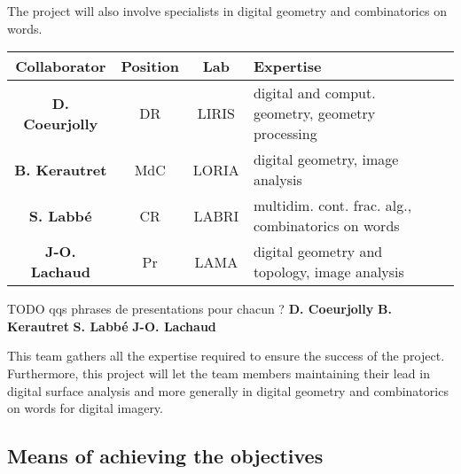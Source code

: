 The project will also involve specialists in digital geometry and combinatorics on words. 
\begin{table}[h]
\small
\centering
\begin{tabular}{|ccclcc|}
\hline
Collaborator & Position & Lab & Expertise \\ \hline
\hline
\textbf{D. Coeurjolly} & DR & LIRIS & digital and comput. geometry, geometry processing \\ \hline
\textbf{B. Kerautret} & MdC & LORIA & digital geometry, image analysis \\ \hline
\textbf{S. Labb\'{e}} & CR & LABRI & multidim. cont. frac. alg., combinatorics on words \\ \hline
\textbf{J-O. Lachaud} & Pr & LAMA & digital geometry and topology, image analysis \\ \hline
\hline
\end{tabular}
\normalsize
\end{table}

TODO qqs phrases de presentations pour chacun ?
\textbf{D. Coeurjolly} 
\textbf{B. Kerautret} 
\textbf{S. Labb\'{e}} 
\textbf{J-O. Lachaud}

This team gathers all the expertise required to ensure the success of the project.
Furthermore, this project will let the team members maintaining their lead in digital surface analysis 
and more generally in digital geometry and combinatorics on words for digital imagery. 


\subsection{Means of achieving the objectives}

